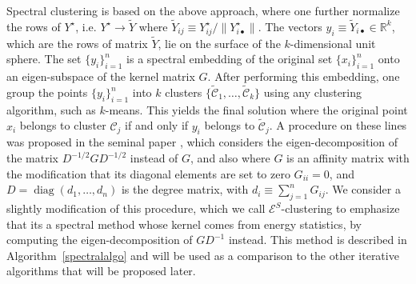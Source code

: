 \documentclass[aps,preprint,nofootinbib,floatfix]{revtex4-1}
\DeclareMathOperator{\diag}{diag}
\newcommand\C{{\mathcal{C}}}
\newcommand\tC{{\widetilde{\C}}}
\begin{document}
Spectral clustering is based on the above approach, where
one further normalize the rows of $Y^\star$, 
i.e. $Y^\star \to \widetilde{Y}$ where 
$\widetilde{Y}_{ij} \equiv Y^\star_{ij} \big/ \| Y^\star_{i\bullet} \|$. 
The vectors
$y_i \equiv \widetilde{Y}_{i\bullet} \in \mathbb{R}^k$, which are the
rows of matrix $\widetilde{Y}$, lie on the surface of the $k$-dimensional 
unit sphere.
The set $\{ y_i \}_{i=1}^n$ is a spectral embedding of the original
set $\{ x_i \}_{i=1}^n$ onto an eigen-subspace of the kernel matrix $G$.
After performing this embedding, one group the points 
$\{ y_i \}_{i=1}^n$ into $k$ clusters 
$\{ \tC_1,\dotsc,\tC_k \}$ using any clustering algorithm, such as
$k$-means. This yields the final solution
where the original point $x_i$ belongs
to cluster $\C_j$ if and only if $y_i$ belongs to $\tC_j$.
A procedure on these lines was proposed in the seminal paper
\cite{NgJordan}, which considers the eigen-decomposition of
the matrix $D^{-1/2} G D^{-1/2}$ instead of $G$, and also 
where $G$ is an affinity matrix with the modification that
its diagonal elements are set to zero $G_{ii}=0$, 
and $D=\diag(d_{1},\dotsc,d_{n})$ is the degree matrix, 
with $d_{i} \equiv \sum_{j=1}^n G_{ij}$. 
We consider a slightly modification of this procedure,
which we call \mbox{$\mathcal{E}^{S}$-clustering} 
to emphasize that its a spectral
method whose kernel comes from energy statistics, by 
computing the 
eigen-decomposition of $G D^{-1}$ instead.
This  method is described in 
Algorithm~\ref{spectralalgo} and will be used as a comparison
to the other iterative algorithms 
that will be proposed later.
\end{document}
